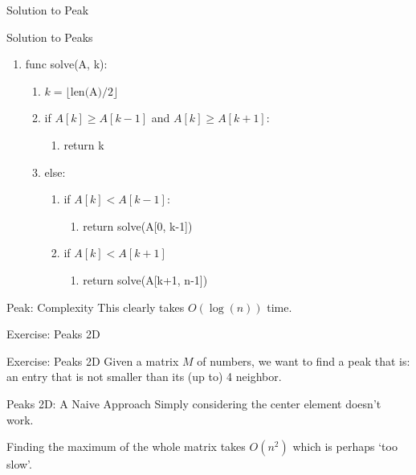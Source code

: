 \documentclass[9pt]{beamer}
\newenvironment{exbox}[1]{\begin{block}{Exercise: #1}}{\end{block}}
\newenvironment{pseudobox}[1]{\begin{exampleblock}{#1}\ttfamily\begin{enumerate}[label=\arabic*.,leftmargin=1.4em,itemsep=0pt]}{\end{enumerate}\end{exampleblock}}
\begin{document}
\begin{frame}[fragile]{Solution to Peak}
\begin{pseudobox}{Solution to Peaks}
\item func solve(A, k):
  \begin{enumerate}[label=\alph*.,leftmargin=1.4em,itemsep=0pt]
  \item $k = \lfloor \text{len(A)}/2 \rfloor$
  \item if $A[k] \geq A[k-1]$ and $A[k] \geq A[k+1]$:
    \begin{enumerate}[label=\roman*.,leftmargin=1.4em,itemsep=0pt]
    \item return k
    \end{enumerate}
  \item else:
    \begin{enumerate}[label=\roman*.,leftmargin=1.4em,itemsep=0pt]
    \item if $A[k] < A[k-1]$:
      \begin{enumerate}[label=--,leftmargin=1.4em,itemsep=0pt]
      \item return solve(A[0, k-1])
      \end{enumerate}
    \item if $A[k] < A[k+1]$
      \begin{enumerate}[label=--,leftmargin=1.4em,itemsep=0pt]
      \item return solve(A[k+1, n-1])
      \end{enumerate}
    \end{enumerate}
  \end{enumerate}
\end{pseudobox}
\end{frame}

\begin{frame}{Peak: Complexity}
This clearly takes $O(\log(n))$ time.
\end{frame}

\begin{frame}{Exercise: Peaks 2D}
\begin{exbox}{Peaks 2D}
Given a matrix $M$ of numbers, we want to find a peak that is: an entry that is not smaller than its (up to) 4 neighbor.
\end{exbox}
\end{frame}

\begin{frame}{Peaks 2D: A Naive Approach}
Simply considering the center element doesn't work.

Finding the maximum of the whole matrix takes $O(n^2)$ which is perhaps `too slow'.
\end{frame}
\end{document}
